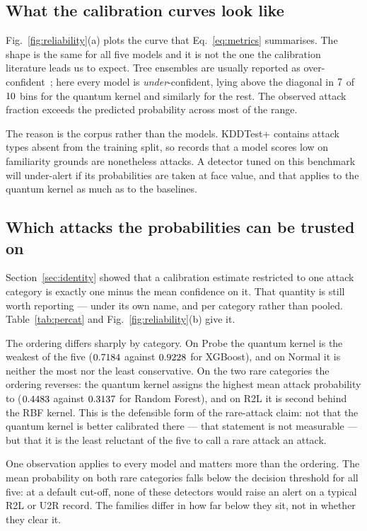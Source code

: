 \documentclass[journal]{IEEEtran}
\begin{document}
\subsection{What the calibration curves look like}
Fig.~\ref{fig:reliability}(a) plots the curve that Eq.~\eqref{eq:metrics}
summarises. The shape is the same for all five models and it is not the one
the calibration literature leads us to expect. Tree ensembles are usually
reported as over-confident~\cite{guo2017calibration}; here every model is
\emph{under}-confident, lying above the diagonal in $7$ of
$10$ bins for the quantum kernel and similarly for the rest. The
observed attack fraction exceeds the predicted probability across most of
the range.

The reason is the corpus rather than the models. KDDTest+ contains attack
types absent from the training split, so records that a model scores low on
familiarity grounds are nonetheless attacks. A detector tuned on this
benchmark will under-alert if its probabilities are taken at face value,
and that applies to the quantum kernel as much as to the baselines.



\subsection{Which attacks the probabilities can be trusted on}
Section~\ref{sec:identity} showed that a calibration estimate restricted to
one attack category is exactly one minus the mean confidence on it. That
quantity is still worth reporting --- under its own name, and per category
rather than pooled. Table~\ref{tab:percat} and
Fig.~\ref{fig:reliability}(b) give it.

The ordering differs sharply by category. On Probe the quantum kernel is the
weakest of the five ($0.7184$ against $0.9228$ for XGBoost),
and on Normal it is neither the most nor the least conservative. On the two
rare categories the ordering reverses: the quantum kernel assigns the
highest mean attack probability to \catUtoRName{} ($0.4483$ against
$0.3137$ for Random Forest), and on R2L it is second behind the RBF
kernel. This is the defensible form of the rare-attack claim: not that the
quantum kernel is better calibrated there --- that statement is not
measurable --- but that it is the least reluctant of the five to call a
rare attack an attack.

One observation applies to every model and matters more than the ordering.
The mean probability on both rare categories falls below the decision
threshold for all five: at a default cut-off, none of these detectors would
raise an alert on a typical R2L or U2R record. The families differ in how
far below they sit, not in whether they clear it.
\end{document}
